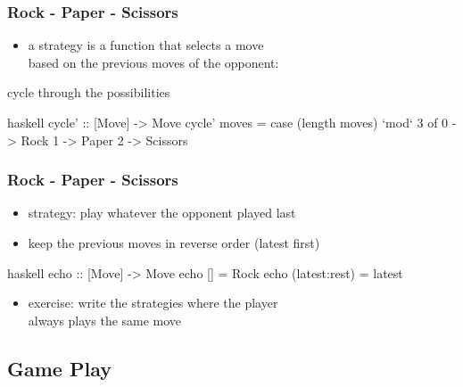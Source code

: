 \documentclass[dvipsnames]{beamer}
\theoremstyle{plain}
\begin{document}
\begin{frame}[fragile]
  \frametitle{Rock - Paper - Scissors}

  \begin{itemize}
    \item a strategy is a function that selects a move\\
      based on the previous moves of the opponent:\\
      \smallskip
  \end{itemize}

  \pause
  \begin{exampleblock}{cycle through the possibilities}
    \begin{pygments}{haskell}
cycle' :: [Move] -> Move
cycle' moves =
    case (length moves) `mod` 3 of
      0 -> Rock
      1 -> Paper
      2 -> Scissors
    \end{pygments}
  \end{exampleblock}
\end{frame}

\begin{frame}[fragile]
  \frametitle{Rock - Paper - Scissors}

  \begin{itemize}
    \item strategy: play whatever the opponent played last
    \item keep the previous moves in reverse order (latest first)
  \end{itemize}

  \begin{exampleblock}{}
    \begin{pygments}{haskell}
echo :: [Move] -> Move
echo [] = Rock
echo (latest:rest) = latest
    \end{pygments}
  \end{exampleblock}

  \pause
  \begin{itemize}
    \item exercise: write the strategies where the player\\
      always plays the same move
  \end{itemize}
\end{frame}

\subsection{Game Play}
\end{document}
